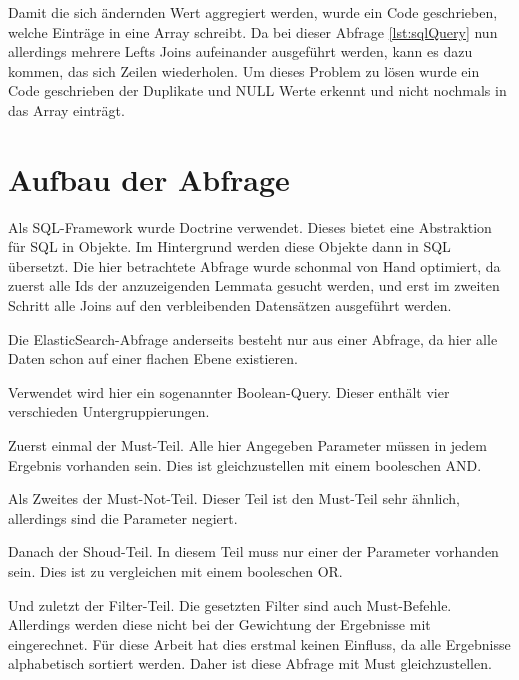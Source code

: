 Damit die sich ändernden Wert aggregiert werden, wurde ein Code geschrieben, welche Einträge in eine Array schreibt. Da bei dieser Abfrage \ref{lst:sqlQuery} nun allerdings mehrere Lefts Joins aufeinander ausgeführt werden, kann es dazu kommen, das sich Zeilen wiederholen. Um dieses Problem zu lösen wurde ein Code geschrieben der Duplikate und NULL Werte erkennt und nicht nochmals in das Array einträgt.

\section{Aufbau der Abfrage}

Als SQL-Framework wurde Doctrine verwendet. Dieses bietet eine Abstraktion für SQL in Objekte. Im Hintergrund werden diese Objekte dann in SQL übersetzt. Die hier betrachtete Abfrage wurde schonmal von Hand optimiert, da zuerst alle Ids der anzuzeigenden Lemmata gesucht werden, und erst im zweiten Schritt alle Joins auf den verbleibenden Datensätzen ausgeführt werden.

Die ElasticSearch-Abfrage anderseits besteht nur aus einer Abfrage, da hier alle Daten schon auf einer flachen Ebene existieren.

Verwendet wird hier ein sogenannter Boolean-Query. Dieser enthält vier verschieden Untergruppierungen.

Zuerst einmal der Must-Teil. Alle hier Angegeben Parameter müssen in jedem Ergebnis vorhanden sein. Dies ist gleichzustellen mit einem booleschen AND. 

Als Zweites der Must-Not-Teil. Dieser Teil ist den Must-Teil sehr ähnlich, allerdings sind die Parameter negiert.

Danach der Shoud-Teil. In diesem Teil muss nur einer der Parameter vorhanden sein. Dies ist zu vergleichen mit einem booleschen OR. 

Und zuletzt der Filter-Teil. Die gesetzten Filter sind auch Must-Befehle. Allerdings werden diese nicht bei der Gewichtung der Ergebnisse mit eingerechnet. Für diese Arbeit hat dies erstmal keinen Einfluss, da alle Ergebnisse alphabetisch sortiert werden. Daher ist diese Abfrage mit Must gleichzustellen. \cite{ElasticsearchB.V..17.12.2019}


